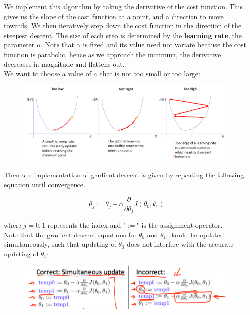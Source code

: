 \documentclass{article}
\begin{document}
        \noindent We implement this algorithm by taking the derivative of the cost function. This gives us the
        slope of the cost function at a point, and a direction to move towards. We then iteratively step down
        the cost function in the direction of the steepest descent. The size of each step is determined by the
        \textbf{learning rate}, the parameter $\alpha$. Note that $\alpha$ is fixed and its value need not variate
        because the cost function is parabolic, hence as we approach the minimum, the derivative decreases in
        magnitude and flattens out. \\

        \noindent We want to choose a value of $\alpha$ that is not too small or too large:

        \begin{figure}[hbt!]
            \centering
            \includegraphics[scale=0.5]{Resources/Learning_Rate.PNG}
        \end{figure}

        \noindent Then our implementation of gradient descent is given by repeating the following equation until
        convergence.

        \begin{equation*}
            \theta_j := \theta_j-\alpha\frac{\partial}{\partial \theta_j}J(\theta_0,\theta_1)
        \end{equation*}

        \noindent where $j=0,1$ represents the index and "$:=$" is the assignment operator. \\

        \noindent Note that the gradient descent equations for $\theta_0$ and $\theta_1$ should be updated
        simultaneously, such that updating of $\theta_0$ does not interfere with the accurate updating of $\theta_1$:

        \begin{figure}[hbt!]
            \centering
            \includegraphics[scale=0.75]{Resources/Simultaneous_Update}
        \end{figure}
\end{document}
